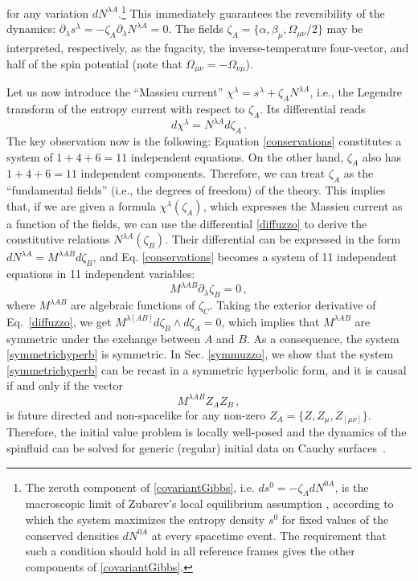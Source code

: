 \documentclass[12pt,aps,prd,nofootinbib,noshowkeys,noshowpacs,longbibliography,
superscriptaddress,tightenlines,floatfix,preprintnumbers]{revtex4-2}
\begin{document}
for any variation $dN^{\lambda A}$.\footnote{The zeroth component of \eqref{covariantGibbs}, i.e. $ds^0=-\zeta_A dN^{0A}$, is the macroscopic limit of Zubarev's local equilibrium assumption \cite{Becattini:2014yxa}, according to which the system maximizes the entropy density $s^0$ for fixed values of the conserved densities $dN^{0A}$ at every spacetime event. The requirement that such a condition should hold in all reference frames gives the other components of \eqref{covariantGibbs}.} This immediately guarantees the reversibility of the dynamics: $\partial_\lambda s^\lambda = -\zeta_A \partial_\lambda N^{\lambda A}=0$. The fields $\zeta_A=\{\alpha, \beta_\mu, \Omega_{\mu \nu}/2 \}$ may be interpreted, respectively, as the fugacity, the inverse-temperature four-vector, and half of the spin potential (note that $\Omega_{\mu \nu}=-\Omega_{\nu \mu}$).

Let us now introduce the ``Massieu current'' $\chi^\lambda=s^\lambda+\zeta_A N^{\lambda A}$, i.e., the Legendre transform of the entropy current with respect to $\zeta_A$. Its differential reads
\begin{equation}\label{diffuzzo}
    d\chi^\lambda = N^{\lambda A} d\zeta_A \, .
\end{equation}
The key observation now is the following: Equation \eqref{conservations} constitutes a system of $1+4+6=11$ independent equations. 
On the other hand, $\zeta_A$ also has $1+4+6=11$ independent components. Therefore, we can treat $\zeta_A$ as the ``fundamental fields'' (i.e., the degrees of freedom) of the theory. This implies that, if we are given a formula $\chi^\lambda(\zeta_A)$, which expresses the Massieu current as a function of the fields, we can use the differential \eqref{diffuzzo} to derive the constitutive relations $N^{\lambda A}(\zeta_B)$. Their differential can be expressed in the form $dN^{\lambda A}=M^{\lambda A B}d\zeta_B$, and Eq. \eqref{conservations} becomes a system of 11 independent equations in 11 independent variables:
\begin{equation}\label{symmetrichyperb}
    M^{\lambda A B}\partial_\lambda \zeta_B=0 \, ,
\end{equation}
where $M^{\lambda AB}$ are algebraic functions of $\zeta_C$. Taking the exterior derivative  of Eq.~\eqref{diffuzzo}, we get $M^{\lambda[AB]}d\zeta_B \wedge d\zeta_A = 0$, which implies that $M^{\lambda AB}$ are symmetric under the exchange between $A$ and $B$. As a consequence, the system \eqref{symmetrichyperb} is symmetric. In Sec. \ref{symmuzzo}, we show that the system \eqref{symmetrichyperb} can be recast in a symmetric hyperbolic form, and it is causal \cite{Geroch_Lindblom_1991_causal} if and only if the vector 
\begin{equation}\label{causality}
    M^{\lambda AB}Z_A Z_B \,,
\end{equation}
is future directed and non-spacelike for any non-zero $Z_A=\{ Z,Z_\mu,Z_{[\mu \nu]} \}$. Therefore, the initial value problem is locally well-posed and the dynamics of the spinfluid can be solved for generic (regular) initial data on Cauchy surfaces~\cite{Kato2009}. 
\end{document}
